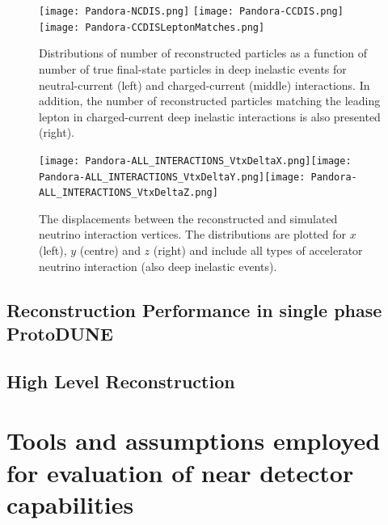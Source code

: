 \begin{figure}[!ht]
\centering
\texttt{[image: Pandora-NCDIS.png]}
\texttt{[image: Pandora-CCDIS.png]}
\texttt{[image: Pandora-CCDISLeptonMatches.png]}
\caption{Distributions of number of reconstructed particles as a function of number of true final-state particles in deep inelastic events for neutral-current (left) and charged-current (middle) interactions. In addition, the number of reconstructed particles matching the leading lepton in charged-current deep inelastic interactions is also presented (right).}
\label{pandora_dis}
\end{figure}


\begin{figure}[!ht]
\centering
\texttt{[image: Pandora-ALL\_INTERACTIONS\_VtxDeltaX.png]}\texttt{[image: Pandora-ALL\_INTERACTIONS\_VtxDeltaY.png]}\texttt{[image: Pandora-ALL\_INTERACTIONS\_VtxDeltaZ.png]}
\caption{The displacements between the reconstructed and simulated neutrino interaction vertices. The distributions are plotted for $x$ (left), $y$ (centre) and $z$ (right) and include all types of accelerator neutrino interaction (also deep inelastic events).}
\label{pandora_vertex_resolution}
\end{figure}

\subsection{Reconstruction Performance in single phase ProtoDUNE}
\label{sec:Pandora:ProtoDUNE}


\subsection{High Level Reconstruction}
\label{sec:Pandora:High}


\section{Tools and assumptions employed for evaluation of near detector capabilities}
\label{sec:tools-nd-eval}